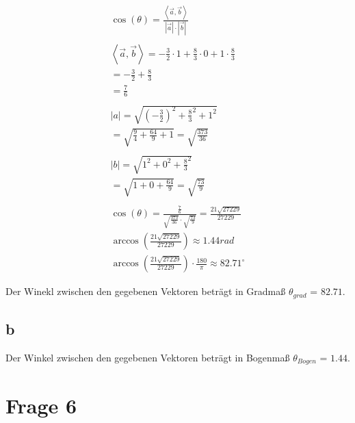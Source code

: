 \begin{align*}
    \cos(\theta) = \frac{\left\langle \vec{a}, \vec{b} \right\rangle}{\left|\vec{a}\right| \cdot \left|\vec{b}\right|} \\\\
    \left\langle \vec{a}, \vec{b} \right\rangle = -\frac{3}{2} \cdot 1 + \frac{8}{3} \cdot 0 + 1 \cdot \frac{8}{3}     \\
    = -\frac{3}{2} + \frac{8}{3}                                                                                       \\
    = \frac{7}{6}                                                                                                      \\\\
    \left|a\right| = \sqrt{{(-\frac{3}{2})}^2 + \frac{8}{3}^2 + 1^2}                                                   \\
    = \sqrt{{\frac{9}{4}} + \frac{64}{9} + 1}
    = \sqrt{\frac{373}{36}}                                                                                            \\\\
    \left|b\right| = \sqrt{1^2 + 0^2 + \frac{8}{3}^2}                                                                  \\
    = \sqrt{1 + 0 + \frac{64}{9}}
    = \sqrt{\frac{73}{9}}                                                                                              \\\\
    \cos(\theta) = \frac{\frac{7}{6}}{\sqrt{\frac{373}{36}} \cdot \sqrt{\frac{73}{9}}} = \frac{21 \sqrt{27229}}{27229} \\
    \arccos\left(\frac{21 \sqrt{27229}}{27229}\right) \approx 1.44 rad                                                 \\
    \arccos\left(\frac{21 \sqrt{27229}}{27229}\right) \cdot \frac{180}{\pi} \approx 82.71^\circ
\end{align*}

Der Winekl zwischen den gegebenen Vektoren beträgt in Gradmaß $\theta_{grad}$ =
$82.71$.

\subsection{b}

Der Winkel zwischen den gegebenen Vektoren beträgt in Bogenmaß $\theta_{Bogen}$
= $1.44$.

\section{Frage 6}

